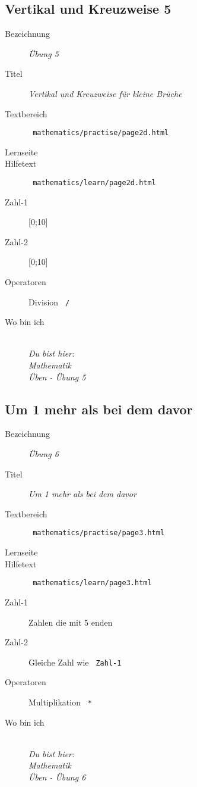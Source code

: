 \subsection{ Vertikal und Kreuzweise 5 }
\label{cha:math-practise-page6}
\begin{description}
  \item[Bezeichnung] \emph{ Übung 5 }
  \item[Titel] \emph{ Vertikal und Kreuzweise für kleine Brüche }
  \item[Textbereich] \texttt{ mathematics/practise/page2d.html }
  \item[Lernseite] 
  \item[Hilfetext] \texttt{ mathematics/learn/page2d.html }
  \item[Zahl-1] [0;10]
  \item[Zahl-2] [0;10]
  \item[Operatoren] Division \texttt{ / }
  \item[Wo bin ich] \emph{\\Du bist hier:\\Mathematik\\Üben - Übung 5}
\end{description}


\subsection{ Um 1 mehr als bei dem davor }
\label{cha:math-practise-page7}
\begin{description}
  \item[Bezeichnung] \emph{ Übung 6 }
  \item[Titel] \emph{ Um 1 mehr als bei dem davor }
  \item[Textbereich] \texttt{ mathematics/practise/page3.html }
  \item[Lernseite] 
  \item[Hilfetext] \texttt{ mathematics/learn/page3.html }
  \item[Zahl-1] Zahlen die mit 5 enden
  \item[Zahl-2] Gleiche Zahl wie \texttt{ Zahl-1 }
  \item[Operatoren] Multiplikation \texttt{ * }
  \item[Wo bin ich] \emph{\\Du bist hier:\\Mathematik\\Üben - Übung 6}
\end{description}


